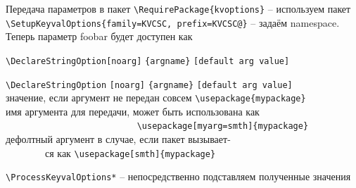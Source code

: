 \begin{frame}[fragile]{Передача параметров в пакет}\relax
    \footnotesize
    \lstinline|\RequirePackage{kvoptions}| -- используем пакет \\ 
    \lstinline|\SetupKeyvalOptions{family=KVCSC, prefix=KVCSC@}| -- задаём namespace. Теперь параметр {\ccsc foobar} будет доступен как \ccol{\KVCSC@foobar}
    \vspace{-1ex}
    {\scriptsize
    \lstset{basicstyle=\tt\tiny}
    \begin{tabbing}
     
     \lstinline|\DeclareStringOption|\= \lstinline|[noarg]| \= \lstinline|{argname}| \= \lstinline|[default arg value]|\kill

        \lstset{basicstyle=\tt\tiny}\lstinline|\DeclareStringOption|\> \lstinline|[noarg]| \> \lstinline|{argname}| \> \lstinline|[default arg value]| \\ 
        \> значение, если аргумент не передан совсем \lstinline|\usepackage{mypackage}|  \> \> \\
        \>  \> имя аргумента для передачи, может быть использована как  \> \\
        \>  \> ~~~~~~~~~~~~~~~~~~~~~~~~~~ \lstinline|\usepackage[myarg=smth]{mypackage}|  \> \\
        \>  \>  \> дефолтный аргумент в случае, если пакет вызывает-  \\
        \>  \>  \> ~~~~~~~~ся как \lstinline|\usepackage[smth]{mypackage}|  \\
    \end{tabbing}
    }

    \vspace{-2ex}
    \lstinline|\ProcessKeyvalOptions*| -- непосредственно подставляем полученные значения
    
\end{frame}

